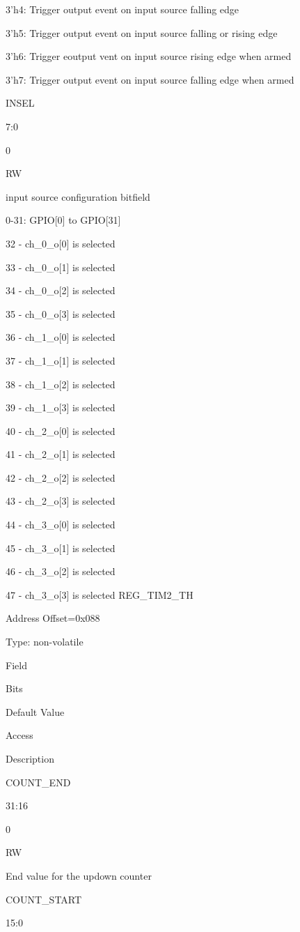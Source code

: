3’h4: Trigger output event on input source falling edge

3’h5: Trigger output event on input source falling or rising edge

3’h6: Trigger eoutput vent on input source rising edge when armed

3’h7: Trigger output event on input source falling edge when armed

INSEL
	

7:0
	

0
	

RW
	

input source configuration bitfield

0-31: GPIO[0] to GPIO[31]

32 - ch_0_o[0] is selected

33 - ch_0_o[1] is selected

34 - ch_0_o[2] is selected

35 - ch_0_o[3] is selected

36 - ch_1_o[0] is selected

37 - ch_1_o[1] is selected

38 - ch_1_o[2] is selected

39 - ch_1_o[3] is selected

40 - ch_2_o[0] is selected

41 - ch_2_o[1] is selected

42 - ch_2_o[2] is selected

43 - ch_2_o[3] is selected

44 - ch_3_o[0] is selected

45 - ch_3_o[1] is selected

46 - ch_3_o[2] is selected

47 - ch_3_o[3] is selected
REG_TIM2_TH

    Address Offset=0x088

    Type: non-volatile

Field
	

Bits
	

Default Value
	

Access
	

Description

COUNT_END
	

31:16
	

0
	

RW
	

End value for the updown counter

COUNT_START
	

15:0
	

